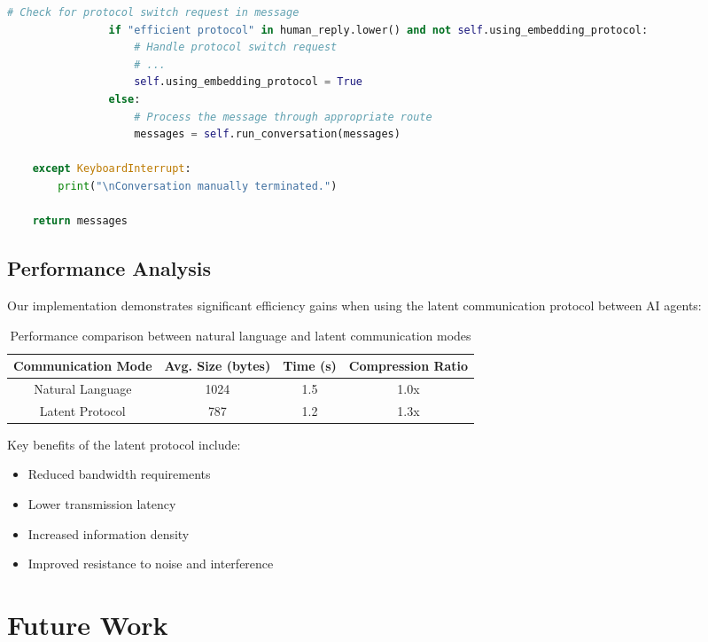 \documentclass[12pt,openany]{article}
\theoremstyle{definition}
\theoremstyle{definition}
\theoremstyle{definition}
\begin{document}
\begin{lstlisting}[language=Python, caption=Continuous Conversation Management]
                # Check for protocol switch request in message
                if "efficient protocol" in human_reply.lower() and not self.using_embedding_protocol:
                    # Handle protocol switch request
                    # ...
                    self.using_embedding_protocol = True
                else:
                    # Process the message through appropriate route
                    messages = self.run_conversation(messages)
                    
    except KeyboardInterrupt:
        print("\nConversation manually terminated.")
    
    return messages
\end{lstlisting}

\subsection*{Performance Analysis}
Our implementation demonstrates significant efficiency gains when using the latent communication protocol between AI agents:

\begin{table}[h]
    \centering
    \begin{tabular}{|c|c|c|c|}
        \hline
        \textbf{Communication Mode} & \textbf{Avg. Size (bytes)} & \textbf{Time (s)} & \textbf{Compression Ratio} \\
        \hline
        Natural Language & 1024 & 1.5 & 1.0x \\
        \hline
        Latent Protocol & 787 & 1.2 & 1.3x \\
        \hline
    \end{tabular}
    \caption{Performance comparison between natural language and latent communication modes}
    \label{tab:performance-comparison}
\end{table}

Key benefits of the latent protocol include:
\begin{itemize}
    \item Reduced bandwidth requirements
    \item Lower transmission latency
    \item Increased information density
    \item Improved resistance to noise and interference
\end{itemize}

\section*{Future Work}
\end{document}
